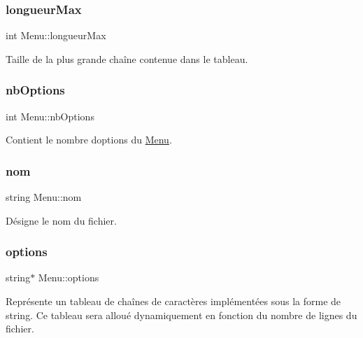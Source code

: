 \subsubsection{\texorpdfstring{longueur\+Max}{longueurMax}}
{\footnotesize\ttfamily int Menu\+::longueur\+Max\hspace{0.3cm}{\ttfamily [private]}}



Taille de la plus grande chaîne contenue dans le tableau. 

\mbox{\label{class_menu_ad59953635d184fefcddf95015a761187}} 
\subsubsection{\texorpdfstring{nb\+Options}{nbOptions}}
{\footnotesize\ttfamily int Menu\+::nb\+Options\hspace{0.3cm}{\ttfamily [private]}}



Contient le nombre d\textquotesingle{}options du \hyperlink{class_menu}{Menu}. 

\mbox{\label{class_menu_a99574cb51606811f697854859bc1ccc1}} 
\subsubsection{\texorpdfstring{nom}{nom}}
{\footnotesize\ttfamily string Menu\+::nom\hspace{0.3cm}{\ttfamily [private]}}



Désigne le nom du fichier. 

\mbox{\label{class_menu_aec975cfea9216420d5754ce2e9321390}} 
\subsubsection{\texorpdfstring{options}{options}}
{\footnotesize\ttfamily string$\ast$ Menu\+::options\hspace{0.3cm}{\ttfamily [private]}}



Représente un tableau de chaînes de caractères implémentées sous la forme de string. Ce tableau sera alloué dynamiquement en fonction du nombre de lignes du fichier. 




